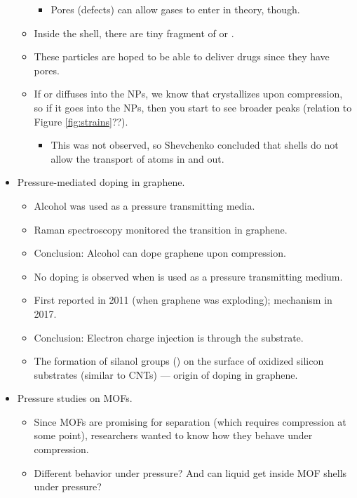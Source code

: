 \documentclass[../notes.tex]{subfiles}
\begin{document}
\begin{itemize}
\begin{itemize}
        \begin{itemize}
            \item Pores (defects) can allow gases to enter in theory, though.
        \end{itemize}
        \item Inside the shell, there are tiny fragment of  or .
        \item These particles are hoped to be able to deliver drugs since they have pores.
        \item If  or  diffuses into the NPs, we know that  crystallizes upon compression, so if it goes into the NPs, then you start to see broader peaks (relation to Figure \ref{fig:strains}??).
        \begin{itemize}
            \item This was not observed, so Shevchenko concluded that  shells do not allow the transport of atoms in and out.
        \end{itemize}
    \end{itemize}
    \item Pressure-mediated doping in graphene.
    \begin{itemize}
        \item Alcohol was used as a pressure transmitting media.
        \item Raman spectroscopy monitored the transition in graphene.
        \item Conclusion: Alcohol can dope graphene upon compression.
        \item No doping is observed when  is used as a pressure transmitting medium.
        \item First reported in 2011 (when graphene was exploding); mechanism in 2017.
        \item Conclusion: Electron charge injection is through the  substrate.
        \item The formation of silanol groups () on the surface of oxidized silicon substrates (similar to CNTs) --- origin of doping in graphene.
    \end{itemize}
    \item Pressure studies on MOFs.
    \begin{itemize}
        \item Since MOFs are promising for separation (which requires compression at some point), researchers wanted to know how they behave under compression.
        \item Different behavior under pressure? And can liquid get inside MOF shells under pressure?

\end{itemize}
\end{itemize}
\end{document}

